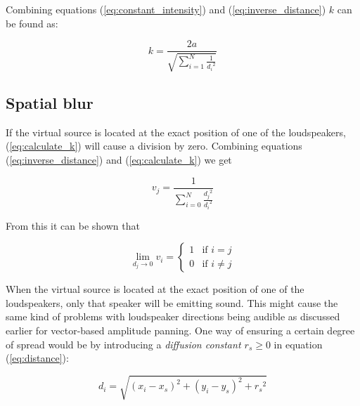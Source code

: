 \documentclass[twoside,10pt]{article}
\begin{document}

Combining equations (\ref{eq:constant_intensity}) and (\ref{eq:inverse_distance}) $k$ can be found as:

\begin{equation} \label{eq:calculate_k}
k = \frac{2a}{\sqrt{\sum_{i=1}^{N} \frac{1}{{d_{i}}^2}}}
\end{equation}




\subsection{Spatial blur}

If the virtual source is located at the exact position of one of the loudspeakers, (\ref{eq:calculate_k}) will cause a division by zero. Combining equations (\ref{eq:inverse_distance}) and (\ref{eq:calculate_k}) we get

\begin{equation}
v_{j} = \frac{1}{\sum_{i=0}^{N} \frac{{d_{j}}^2}{{d_{i}}^2}}
\end{equation}

From this it can be shown that

\begin{equation} \label{eq:distance_zero}
\lim_{d_{j} \rightarrow 0} v_{i} = 
\left\{ \begin{array}{ll} 
1 & \textrm{if $i=j$}\\ 
0 & \textrm{if $i \ne j$}
\end{array} \right.
\end{equation}

When the virtual source is located at the exact position of one of the loudspeakers, only that speaker will be emitting sound. This might cause the same kind of problems with loudspeaker directions being audible as discussed earlier for vector-based amplitude panning. One way of ensuring a certain degree of spread would be by introducing a \textit{diffusion constant $r_{s} \ge 0$} in equation (\ref{eq:distance}):

\begin{equation} \label{eq:mod_distance}
d_{i} = \sqrt{ {(x_{i} - x_{s})}^2 + {(y_{i} - y_{s})}^2 + {r_{s}}^2}
\end{equation}
\end{document}

